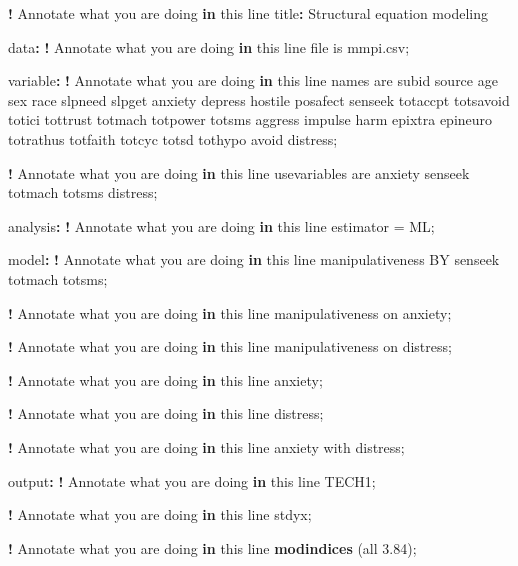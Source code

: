 \documentclass[
]{book}
\newenvironment{Shaded}{\begin{snugshade}}{\end{snugshade}}
\newcommand{\ControlFlowTok}[1]{\textcolor[rgb]{0.13,0.29,0.53}{\textbf{#1}}}
\newcommand{\FloatTok}[1]{\textcolor[rgb]{0.00,0.00,0.81}{#1}}
\newcommand{\FunctionTok}[1]{\textcolor[rgb]{0.13,0.29,0.53}{\textbf{#1}}}
\newcommand{\NormalTok}[1]{#1}
\newcommand{\OtherTok}[1]{\textcolor[rgb]{0.56,0.35,0.01}{#1}}
\newcommand{\SpecialCharTok}[1]{\textcolor[rgb]{0.81,0.36,0.00}{\textbf{#1}}}
\begin{document}
\begin{Shaded}
\begin{Highlighting}[]
\SpecialCharTok{!}\NormalTok{ Annotate what you are doing }\ControlFlowTok{in}\NormalTok{ this line}
\NormalTok{title}\SpecialCharTok{:}\NormalTok{ Structural equation modeling}

\NormalTok{data}\SpecialCharTok{:}
\SpecialCharTok{!}\NormalTok{ Annotate what you are doing }\ControlFlowTok{in}\NormalTok{ this line}
\NormalTok{file is mmpi.csv;}

\NormalTok{variable}\SpecialCharTok{:}
\SpecialCharTok{!}\NormalTok{ Annotate what you are doing }\ControlFlowTok{in}\NormalTok{ this line}
\NormalTok{names are subid source age sex race slpneed slpget anxiety depress}
\NormalTok{hostile posafect senseek totaccpt totsavoid totici tottrust totmach}
\NormalTok{totpower totsms aggress impulse harm epixtra epineuro totrathus}
\NormalTok{totfaith totcyc totsd tothypo avoid distress;}

\SpecialCharTok{!}\NormalTok{ Annotate what you are doing }\ControlFlowTok{in}\NormalTok{ this line}
\NormalTok{usevariables are anxiety senseek totmach totsms distress;}

\NormalTok{analysis}\SpecialCharTok{:}
\SpecialCharTok{!}\NormalTok{ Annotate what you are doing }\ControlFlowTok{in}\NormalTok{ this line}
\NormalTok{estimator }\OtherTok{=}\NormalTok{ ML;}

\NormalTok{model}\SpecialCharTok{:}
\SpecialCharTok{!}\NormalTok{ Annotate what you are doing }\ControlFlowTok{in}\NormalTok{ this line}
\NormalTok{manipulativeness BY senseek totmach totsms;}

\SpecialCharTok{!}\NormalTok{ Annotate what you are doing }\ControlFlowTok{in}\NormalTok{ this line}
\NormalTok{manipulativeness on anxiety;}

\SpecialCharTok{!}\NormalTok{ Annotate what you are doing }\ControlFlowTok{in}\NormalTok{ this line}
\NormalTok{manipulativeness on distress;}

\SpecialCharTok{!}\NormalTok{ Annotate what you are doing }\ControlFlowTok{in}\NormalTok{ this line}
\NormalTok{anxiety;}

\SpecialCharTok{!}\NormalTok{ Annotate what you are doing }\ControlFlowTok{in}\NormalTok{ this line}
\NormalTok{distress;}

\SpecialCharTok{!}\NormalTok{ Annotate what you are doing }\ControlFlowTok{in}\NormalTok{ this line}
\NormalTok{anxiety with distress;}

\NormalTok{output}\SpecialCharTok{:}
\SpecialCharTok{!}\NormalTok{ Annotate what you are doing }\ControlFlowTok{in}\NormalTok{ this line}
\NormalTok{TECH1;}

\SpecialCharTok{!}\NormalTok{ Annotate what you are doing }\ControlFlowTok{in}\NormalTok{ this line}
\NormalTok{stdyx;}

\SpecialCharTok{!}\NormalTok{ Annotate what you are doing }\ControlFlowTok{in}\NormalTok{ this line}
\FunctionTok{modindices}\NormalTok{ (all }\FloatTok{3.84}\NormalTok{);}
\end{Highlighting}
\end{Shaded}
\end{document}
